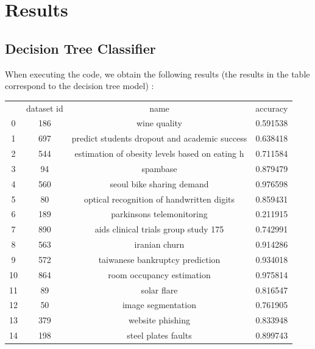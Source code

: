 \documentclass[10pt, a4paper]{article}
\begin{document}
\section{Results}

\subsection{Decision Tree Classifier}

When executing the code, we obtain the following results (the results in the table correspond to the decision tree model) :


\begin{tabular}{cccc}
   & dataset id                                            &   name & accuracy \\
0     &     186         &                             wine quality & 0.591538 \\
1     &     697     & predict students dropout and academic success & 0.638418 \\
2     &    544  & estimation of obesity levels based on eating h & 0.711584 \\
3     &     94   &                                       spambase & 0.879479 \\
4     &    560   &                      seoul bike sharing demand & 0.976598 \\
5     &     80   &      optical recognition of handwritten digits & 0.859431 \\
6     &    189   &                      parkinsons telemonitoring & 0.211915 \\
7     &    890   &           aids clinical trials group study 175 & 0.742991 \\
8     &    563   &                                  iranian churn & 0.914286 \\
9    &    572    &               taiwanese bankruptcy prediction & 0.934018 \\
10   &     864   &                      room occupancy estimation & 0.975814 \\
11   &      89   &                                    solar flare & 0.816547 \\
12   &      50   &                             image segmentation & 0.761905 \\
13   &     379   &                               website phishing & 0.833948 \\
14   &     198   &                            steel plates faults & 0.899743 \\

\end{tabular}
\end{document}
